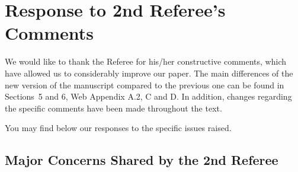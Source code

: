     \section*{Response to 2nd Referee's Comments}
    We would like to thank the Referee for his/her constructive comments, which have allowed us to considerably improve our paper. The main differences of the new version of the manuscript compared to the previous one can be found in Sections~5 and 6, Web Appendix A.2, C and D. In addition, changes regarding the specific comments have been made throughout the text.

    You may find below our responses to the specific issues raised.

    \subsection*{Major Concerns Shared by the 2nd Referee}
